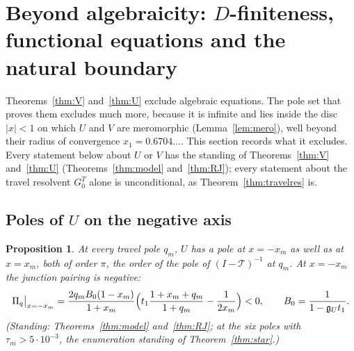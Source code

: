\documentclass[11pt]{article}
\theoremstyle{plain}
\newtheorem{proposition}[theorem]{Proposition}
\theoremstyle{definition}
\theoremstyle{remark}
\begin{document}
\section{Beyond algebraicity: \texorpdfstring{$D$}{D}-finiteness, functional equations and the
natural boundary}\label{sec:beyond}

Theorems~\ref{thm:V} and~\ref{thm:U} exclude algebraic equations. The pole set that proves them
excludes much more, because it is infinite and lies inside the disc $|x|<1$ on which $U$ and $V$ are
meromorphic (Lemma~\ref{lem:mero}), well beyond their radius of convergence $x_1=0.6704\ldots$. This
section records what it excludes. Every statement below about $U$ or $V$ has the standing of
Theorems~\ref{thm:V} and~\ref{thm:U} (Theorems~\ref{thm:model} and~\ref{thm:RJ}); every statement
about the travel resolvent $G^T_0$ alone is unconditional, as Theorem~\ref{thm:travelres} is.

\subsection{Poles of \texorpdfstring{$U$}{U} on the negative axis}

\begin{proposition}\label{prop:minusx}
At every travel pole $q_m$, $U$ has a pole at $x=-x_m$ as well as at $x=x_m$, both of order
$\pi$, the order of the pole of $(I-\mathcal T)^{-1}$ at $q_m$. At $x=-x_m$ the junction pairing is
negative:
\[
   \Pi_q\big|_{x=-x_m}=\frac{2q_mB_0(1-x_m)}{1+x_m}\Bigl(t_1\frac{1+x_m+q_m}{1+q_m}
   -\frac1{2x_m}\Bigr)<0,\qquad B_0=\frac1{1-\mathfrak g_Ut_1}.
\]
\textup{(}Standing: Theorems~\ref{thm:model} and~\ref{thm:RJ}; at the six poles with
$\tau_m>5\cdot10^{-3}$, the enumeration standing of Theorem~\ref{thm:star}.\textup{)}
\end{proposition}
\end{document}

